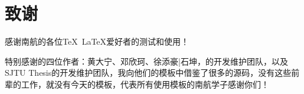 \chapter{致谢}

感谢南航的各位\TeX~\LaTeX 爱好者的测试和使用！

特别感谢\oldnuaathesis 的四位作者：黄大宁、邓欣珂、徐添豪|石坤，\seuthesix 的开发维护团队，以及SJTU Thesis的开发维护团队，我向他们的模板中借鉴了很多的源码，没有这些前辈的工作，就没有今天的\nuaathesis 模板，代表所有使用\nuaathesis 模板的南航学子感谢你们！
